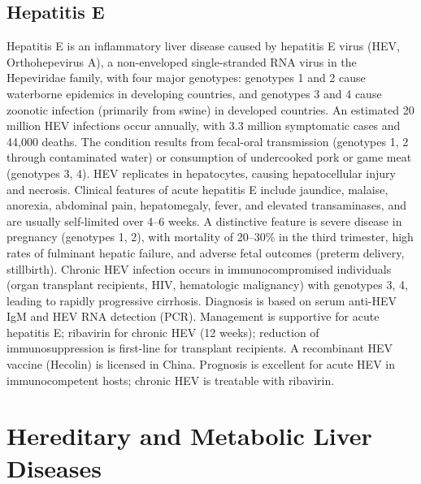 \subsection{Hepatitis E}
\label{sec:Hepatitis E}
Hepatitis E is an inflammatory liver disease caused by hepatitis E virus (HEV, Orthohepevirus A), a non-enveloped single-stranded RNA virus in the Hepeviridae family, with four major genotypes: genotypes 1 and 2 cause waterborne epidemics in developing countries, and genotypes 3 and 4 cause zoonotic infection (primarily from swine) in developed countries. An estimated 20 million HEV infections occur annually, with 3.3 million symptomatic cases and 44,000 deaths. The condition results from fecal-oral transmission (genotypes 1, 2 through contaminated water) or consumption of undercooked pork or game meat (genotypes 3, 4). HEV replicates in hepatocytes, causing hepatocellular injury and necrosis. Clinical features of acute hepatitis E include jaundice, malaise, anorexia, abdominal pain, hepatomegaly, fever, and elevated transaminases, and are usually self-limited over 4--6 weeks. A distinctive feature is severe disease in pregnancy (genotypes 1, 2), with mortality of 20--30\% in the third trimester, high rates of fulminant hepatic failure, and adverse fetal outcomes (preterm delivery, stillbirth). Chronic HEV infection occurs in immunocompromised individuals (organ transplant recipients, HIV, hematologic malignancy) with genotypes 3, 4, leading to rapidly progressive cirrhosis. Diagnosis is based on serum anti-HEV IgM and HEV RNA detection (PCR). Management is supportive for acute hepatitis E; ribavirin for chronic HEV (12 weeks); reduction of immunosuppression is first-line for transplant recipients. A recombinant HEV vaccine (Hecolin) is licensed in China. Prognosis is excellent for acute HEV in immunocompetent hosts; chronic HEV is treatable with ribavirin.

\section{Hereditary and Metabolic Liver Diseases}




